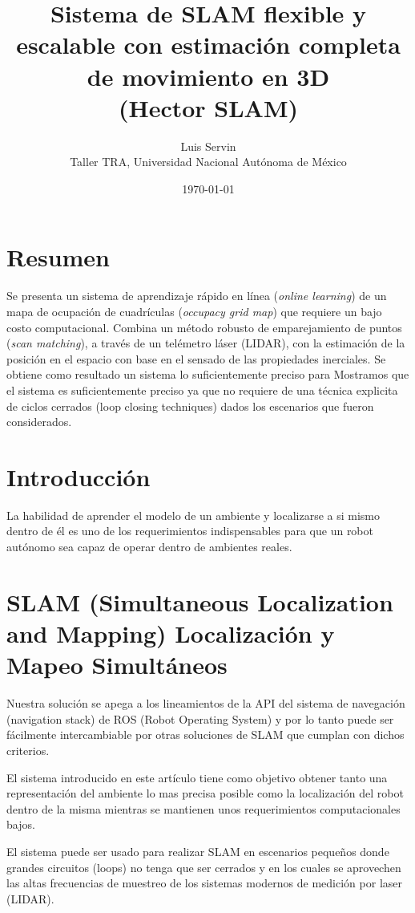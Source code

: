 \documentclass[10pt,a4paper]{article}
\title{\vspace{-6ex}Sistema de SLAM flexible y escalable con estimación completa de movimiento en 3D \\  \large{(Hector SLAM)}\vspace{-2ex}}
\date{\today}
\author{Luis Servin\\ Taller TRA, Universidad Nacional Autónoma de México}
\begin{document}
\maketitle

\section*{Resumen}

Se presenta un sistema de aprendizaje rápido en línea (\emph{online learning}) de un mapa de ocupación de cuadrículas (\emph{occupacy grid map}) que requiere un bajo costo computacional. Combina un método robusto de emparejamiento de puntos (\emph{scan matching}), a través de un telémetro láser (LIDAR), con la estimación de la posición en el espacio con base en el sensado de las propiedades inerciales. Se obtiene como resultado un sistema lo suficientemente preciso para 
Mostramos que el sistema es suficientemente preciso ya que no requiere de una técnica explicita de ciclos cerrados (loop closing techniques) dados los escenarios que fueron considerados.

\section{Introducción}

La habilidad de aprender el modelo de un ambiente y localizarse a si mismo dentro de él es uno de los requerimientos indispensables para que un robot autónomo sea capaz de operar dentro de ambientes reales.

\section{SLAM (Simultaneous Localization and Mapping) Localización y Mapeo Simultáneos}

Nuestra solución se apega a los lineamientos de la API del sistema de navegación (navigation stack) de ROS (Robot Operating System) y por lo tanto puede ser fácilmente intercambiable por otras soluciones de SLAM que cumplan con dichos criterios.

El sistema introducido en este artículo tiene como objetivo obtener tanto una representación del ambiente lo mas precisa posible como la localización del robot dentro de la misma mientras se mantienen unos requerimientos computacionales bajos.

El sistema puede ser usado para realizar SLAM en escenarios pequeños donde grandes circuitos (loops) no tenga que ser cerrados y en los cuales se aprovechen las altas frecuencias de muestreo de los sistemas modernos de medición por laser (LIDAR).
\end{document}
